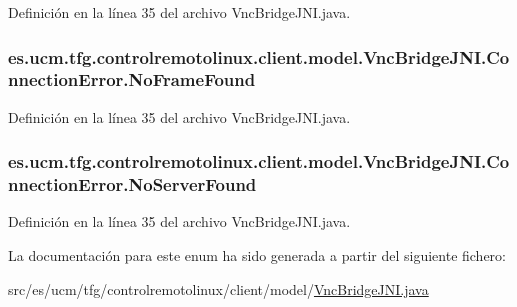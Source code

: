 Definición en la línea 35 del archivo Vnc\-Bridge\-J\-N\-I.\-java.

\hypertarget{enumes_1_1ucm_1_1tfg_1_1controlremotolinux_1_1client_1_1model_1_1VncBridgeJNI_1_1ConnectionError_afbe2036cc30e922ee76a255392dd745d}{
\subsubsection[{No\-Frame\-Found}]{\setlength{\rightskip}{0pt plus 5cm}es.\-ucm.\-tfg.\-controlremotolinux.\-client.\-model.\-Vnc\-Bridge\-J\-N\-I.\-Connection\-Error.\-No\-Frame\-Found}}\label{enumes_1_1ucm_1_1tfg_1_1controlremotolinux_1_1client_1_1model_1_1VncBridgeJNI_1_1ConnectionError_afbe2036cc30e922ee76a255392dd745d}


Definición en la línea 35 del archivo Vnc\-Bridge\-J\-N\-I.\-java.

\hypertarget{enumes_1_1ucm_1_1tfg_1_1controlremotolinux_1_1client_1_1model_1_1VncBridgeJNI_1_1ConnectionError_a455ef547660109752a4fcd677dbaf574}{
\subsubsection[{No\-Server\-Found}]{\setlength{\rightskip}{0pt plus 5cm}es.\-ucm.\-tfg.\-controlremotolinux.\-client.\-model.\-Vnc\-Bridge\-J\-N\-I.\-Connection\-Error.\-No\-Server\-Found}}\label{enumes_1_1ucm_1_1tfg_1_1controlremotolinux_1_1client_1_1model_1_1VncBridgeJNI_1_1ConnectionError_a455ef547660109752a4fcd677dbaf574}


Definición en la línea 35 del archivo Vnc\-Bridge\-J\-N\-I.\-java.



La documentación para este enum ha sido generada a partir del siguiente fichero\-:\begin{DoxyCompactItemize}
\item 
src/es/ucm/tfg/controlremotolinux/client/model/\hyperlink{VncBridgeJNI_8java}{Vnc\-Bridge\-J\-N\-I.\-java}\end{DoxyCompactItemize}
